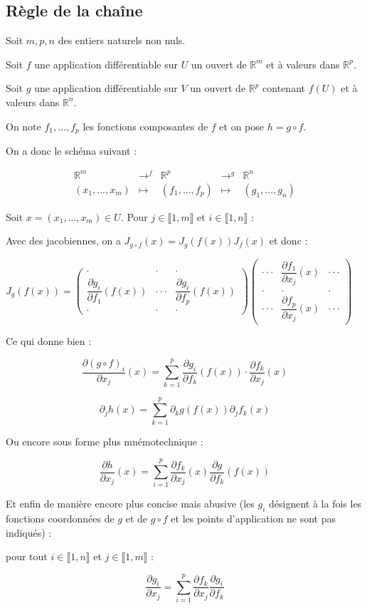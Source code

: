 \documentclass[a4paper,12pt]{book}
\newcommand{\Prop}[2]{\begin{tcolorbox}[sharp corners, colback=white,colframe=red!90!black!75, title=Proposition : #1]#2\end{tcolorbox}}
\def\R{\mathbb{R}}
\begin{document}
\subsection{Règle de la chaîne}
\Prop{Règle de la châine}{Soit $m,p,n$ des entiers naturels non nuls.
\par Soit $f$ une application différentiable sur $U$ un ouvert de $\R^m$ et à valeurs dans $\R^p$.
\par Soit $g$ une application différentiable sur $V$ un ouvert de $\R^p$ contenant $f(U)$ et à valeurs dans $\R^n$.
\par On note $f_1,..., f_p$ les fonctions composantes de $f$ et on pose $h = g\circ f$.
\par On a donc le schéma suivant :
\par $$\begin{array}{ccccc} \R^m & \to^f & \R^p & \to^g & \R^n \\ (x_1,...,x_m) & \mapsto & (f_1,..., f_p) & \mapsto & (g_1,..., g_n)\end{array}$$
\par Soit $x=(x_1,..., x_m)\in U$. Pour $j\in \llbracket 1, m\rrbracket$ et $i\in\llbracket 1,n\rrbracket$ :
\par Avec des jacobiennes, on a $J_{g\circ f}(x) = J_g(f(x))J_f(x)$ et donc :
\par $J_g(f(x)) = \begin{pmatrix} \cdot&\cdot&\cdot \\ \dfrac{\partial g_i}{\partial f_1}(f(x)) & \cdot\cdot\cdot&\dfrac{\partial g_i}{\partial f_p}(f(x)) \\ \cdot&\cdot&\cdot\end{pmatrix} \begin{pmatrix} \cdot\cdot\cdot & \dfrac{\partial f_1}{\partial x_j}(x) & \cdot\cdot\cdot \\ . & .&.\\ \cdot\cdot\cdot & \dfrac{\partial f_p}{\partial x_j}(x)& \cdot\cdot\cdot\end{pmatrix}$
\par Ce qui donne bien :
\par $$\dfrac{\partial (g\circ f)_i}{\partial x_j}(x) = \sum\limits_{k=1}^p\dfrac{\partial g_i}{\partial f_k}(f(x))\cdot\dfrac{\partial f_k}{\partial x_j}(x)$$
\par $$\partial_jh(x)=\sum\limits_{k=1}^p\partial_kg(f(x))\partial_jf_k(x)$$
\par Ou encore sous forme plus mnémotechnique :
\par $$\dfrac{\partial h}{\partial x_j}(x) =\sum\limits_{i=1}^p\dfrac{\partial f_k}{\partial x_j}(x)\dfrac{\partial g}{\partial f_k}(f(x))$$ 
\par Et enfin de manière encore plus concise mais abusive (les $g_i$ désignent à la fois les fonctions coordonnées de $g$ et de $g\circ f$ et les points d'application ne sont pas indiqués) :
\par pour tout $i\in\llbracket 1, n\rrbracket$ et $j\in\llbracket 1,m\rrbracket$ :
\par $$\dfrac{\partial g_i}{\partial x_j}=\sum\limits_{i=1}^p\dfrac{\partial f_k}{\partial x_j}\dfrac{\partial g_i}{\partial f_k}$$}
\end{document}
